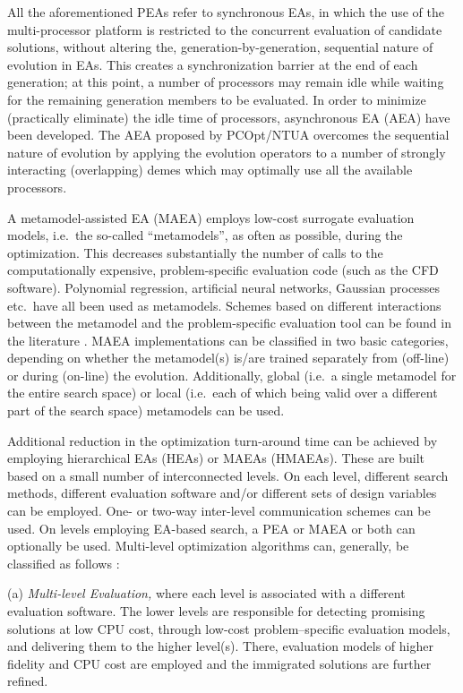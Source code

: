 All the aforementioned PEAs refer to synchronous EAs, in which the use of the multi-processor platform is restricted to the concurrent evaluation of candidate solutions, without altering the, generation-by-generation, sequential nature of evolution in EAs. This creates a synchronization barrier at the end of each generation; at this point, a number of processors may remain idle while waiting for the remaining generation members to be evaluated.  In order to minimize (practically eliminate) the idle time of processors, asynchronous EA (AEA) \cite{LTT_2_040,Alba2001} have been developed. The AEA proposed by PCOpt/NTUA overcomes the sequential nature of evolution by applying the evolution operators to a number of strongly interacting (overlapping) demes which may optimally use all the available processors.     

A metamodel-assisted EA (MAEA) employs low-cost surrogate evaluation models, i.e.\ the so-called ``metamodels'', as often as possible, during the optimization. This decreases substantially the number of calls to the computationally expensive, problem-specific evaluation code (such as the CFD software). Polynomial regression, artificial neural networks, Gaussian processes etc.\ have all been used as metamodels. Schemes based on different interactions between the metamodel and the problem-specific evaluation tool can be found in the literature \cite{KEANEbook,LTT_2_020,Jin2002,LTT_2_027}. MAEA implementations can be classified in two basic categories, depending on whether the metamodel(s) is/are trained separately from (off-line) or during (on-line) the evolution. Additionally, global (i.e.\ a single metamodel for the entire search space) or local (i.e.\ each of which being valid over a different part of the search space) metamodels can be used.

Additional reduction in the optimization turn-around time can be achieved by employing hierarchical EAs (HEAs) or MAEAs (HMAEAs)\cite{phd_Karakasis,phd_Kampolis,Herr1999,LTT_2_044, LTT_2_031,Lim2007}. These are built based on a small number of interconnected levels. On each level, different search methods, different evaluation software and/or different sets of design variables can be employed. One- or two-way inter-level communication schemes can be used. On levels employing EA-based search, a PEA or MAEA or both can optionally be used. Multi-level optimization algorithms can, generally, be classified as follows \cite{ParCFD}:

(a) \emph{Multi-level Evaluation,} where each level is associated with
a different evaluation software. The lower levels are responsible
for detecting promising solutions  at low CPU cost, through low-cost problem--specific evaluation models, and
delivering them to the higher level(s). There, evaluation models of
higher fidelity and CPU cost are employed and the immigrated
solutions are further refined. 

